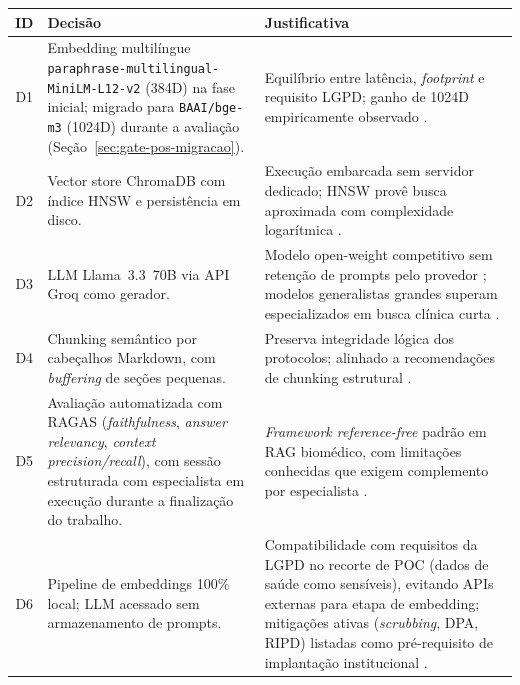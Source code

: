 \documentclass[
  12pt,
  oneside,
  a4paper,
  english,
  brazil
]{abntex2}
\begin{document}
\begin{quadro}[!htbp]
  \centering
  \small
  \renewcommand{\arraystretch}{1.15}
  \caption{Decisões técnico-arquiteturais do chatbot ILTB (D1--D6)}
  \label{quad:decisoes-tecnicas}
  \begin{tabularx}{\textwidth}{|c|X|X|}
  \hline
  \rowcolor{gray!25}
  \textbf{ID} & \textbf{Decisão} & \textbf{Justificativa} \\ \hline
  D1  & Embedding multilíngue \texttt{paraphrase-multilingual-MiniLM-L12-v2}
        (384D) na fase inicial; migrado para \texttt{BAAI/bge-m3} (1024D) durante
        a avaliação (Seção~\ref{sec:gate-pos-migracao}). & Equilíbrio entre
        latência, \textit{footprint} e requisito LGPD; ganho de 1024D
        empiricamente observado \cite{reimers2019, mmteb2025, SHTI2023,
        marone2025mmbert}. \\ \hline
  D2  & Vector store ChromaDB com índice HNSW e persistência em disco.
      & Execução embarcada sem servidor dedicado; HNSW provê busca aproximada
        com complexidade logarítmica \cite{malkov2016, chroma2024}. \\ \hline
  D3  & LLM Llama~3.3~70B via API Groq como gerador. & Modelo open-weight
        competitivo sem retenção de prompts pelo provedor
        \cite{dubey2024}; modelos generalistas grandes superam especializados em
        busca clínica curta \cite{ocaf2024}. \\ \hline
  D4  & Chunking semântico por cabeçalhos Markdown, com
        \textit{buffering} de seções pequenas. & Preserva integridade lógica dos
        protocolos; alinhado a recomendações de chunking estrutural
        \cite{gao2024, advancedChunkingRAG2025}. \\ \hline
  D5  & Avaliação automatizada com RAGAS (\textit{faithfulness},
        \textit{answer relevancy}, \textit{context precision/recall}),
        com sessão estruturada com especialista em execução durante a
        finalização do trabalho. &
        \textit{Framework reference-free} padrão em RAG biomédico, com
        limitações conhecidas que exigem complemento por especialista
        \cite{es2024, ocaf2024, gallifant2025tripod}. \\ \hline
  D6  & Pipeline de embeddings 100\% local; LLM acessado sem
        armazenamento de prompts. & Compatibilidade com requisitos
        da LGPD no recorte de POC (dados de saúde como sensíveis), evitando
        APIs externas para etapa de embedding; mitigações ativas
        (\emph{scrubbing}, DPA, RIPD) listadas como pré-requisito de
        implantação institucional \cite{lgpdSaude2023, lgpdEnfermagem2022,
        privacyRAGHealthcare2025, sokPrivacyLLM2026}. \\ \hline
  \end{tabularx}
  \caption*{Fonte: Produção do próprio autor.}
\end{quadro}
\end{document}

